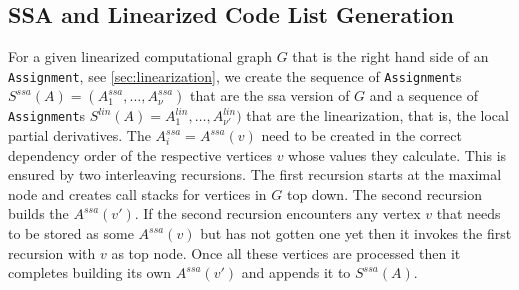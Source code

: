 \documentclass{book}
\newcommand{\Assignment}{{\tt Assignment}}
\begin{document}
\subsection{SSA and Linearized Code List Generation}
\label{ssec:code_gen_lin_code_list}
For a given linearized computational graph $G$ that is the 
right hand side of an \Assignment, 
see \ref{sec:linearization}, 
we create the sequence of {\Assignment}s 
$S^{ssa}(A)=(A^{ssa}_1,\ldots,A^{ssa}_\nu)$
that are the 
ssa version of $G$ and a sequence of {\Assignment}s
$S^{lin}(A)=A^{lin}_1,\ldots,A^{lin}_{\nu'})$
that are
the linearization, that is, the local partial derivatives.
The $A^{ssa}_i=A^{ssa}(v)$ need to be created in the correct 
dependency order of the respective vertices $v$ whose values they
calculate. 
This is ensured by two interleaving recursions.
The first recursion starts at the maximal node 
and creates call stacks for vertices in $G$
top down. 
The second recursion builds the $A^{ssa}(v')$. 
If the second recursion encounters any vertex $v$ that needs to be 
stored as some $A^{ssa}(v)$ but has not gotten one yet 
then it invokes the first recursion with $v$
as top node. 
Once all these vertices are processed
then it completes building its own $A^{ssa}(v')$ and 
appends it to $S^{ssa}(A)$. 
\end{document}
